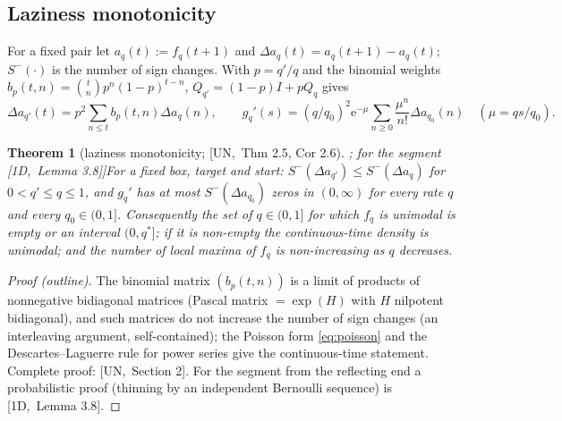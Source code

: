 \documentclass[10pt,a4paper]{article}
\theoremstyle{plain}
\newtheorem{theorem}{Theorem}[section]
\theoremstyle{definition}
\newcommand{\src}[2]{[\textsf{#1},~#2]}           %
\newcommand{\ONE}{\textsf{1D}}
\newcommand{\UNI}{\textsf{UN}}
\newcommand{\ee}{\mathrm{e}}
\begin{document}
\subsection{Laziness monotonicity}

For a fixed pair let $a_q(t):=f_q(t+1)$ and $\Delta a_q(t)=a_q(t+1)-a_q(t)$; $S^-(\cdot)$ is the number of sign changes. With $p=q'/q$ and the binomial weights $b_p(t,n)=\binom tnp^n(1-p)^{t-n}$, $Q_{q'}=(1-p)I+pQ_q$ gives
\begin{equation}\label{eq:poisson}
\Delta a_{q'}(t)=p^2\sum_{n\le t}b_p(t,n)\Delta a_q(n),\qquad g_q'(s)=(q/q_0)^2\ee^{-\mu}\sum_{n\ge0}\frac{\mu^n}{n!}\Delta a_{q_0}(n)\quad(\mu=qs/q_0).
\end{equation}

\begin{theorem}[laziness monotonicity; \src{\UNI}{Thm 2.5, Cor 2.6}; for the segment \src{\ONE}{Lemma 3.8}]\label{thm:laziness}
For a fixed box, target and start: $S^-(\Delta a_{q'})\le S^-(\Delta a_q)$ for $0<q'\le q\le1$, and $g_q'$ has at most $S^-(\Delta a_{q_0})$ zeros in $(0,\infty)$ for every rate $q$ and every $q_0\in(0,1]$. Consequently the set of $q\in(0,1]$ for which $f_q$ is unimodal is empty or an interval $(0,q^*]$; if it is non-empty the continuous-time density is unimodal; and the number of local maxima of $f_q$ is non-increasing as $q$ decreases.
\end{theorem}
\begin{proof}[Proof (outline)]
The binomial matrix $(b_p(t,n))$ is a limit of products of nonnegative bidiagonal matrices (Pascal matrix $=\exp(H)$ with $H$ nilpotent bidiagonal), and such matrices do not increase the number of sign changes (an interleaving argument, self-contained); the Poisson form \eqref{eq:poisson} and the Descartes--Laguerre rule for power series give the continuous-time statement. Complete proof: \src{\UNI}{Section 2}. For the segment from the reflecting end a probabilistic proof (thinning by an independent Bernoulli sequence) is \src{\ONE}{Lemma 3.8}.
\end{proof}
\end{document}
